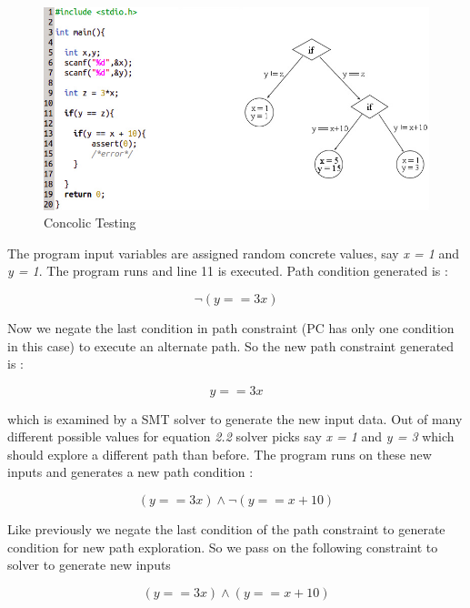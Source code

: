 \documentclass[12pt,oneside]{book}
\begin{document}
\newpage

\begin{figure}[htbp]
\centering
\includegraphics[scale=0.5]{conjoined4.png}
\caption{Concolic Testing}
\end{figure}

The program input variables are assigned random concrete values, say \textit{x = 1} and \textit{y = 1}. The program runs and line 11 is executed. Path condition generated is :

\begin{equation}
\neg(y == 3x)
\end{equation}

Now we negate the last condition in path constraint (PC has only one condition in this case) to execute an alternate path. So the new path constraint generated is :

\begin{equation}
y == 3x
\end{equation}

which is examined by a SMT solver to generate the new input data. Out of many different possible values for equation \textit{2.2} solver picks say \textit{x = 1} and \textit{y = 3} which should explore a different path than before. The program runs on these new inputs and generates a new path condition :

\begin{equation}
(y == 3x) \wedge \neg(y == x + 10)
\end{equation}

Like previously we negate the last condition of the path constraint to generate condition for new path exploration.
So we pass on the following constraint to solver to generate new inputs

\begin{equation}
(y == 3x) \wedge (y == x + 10)
\end{equation}
\end{document}
